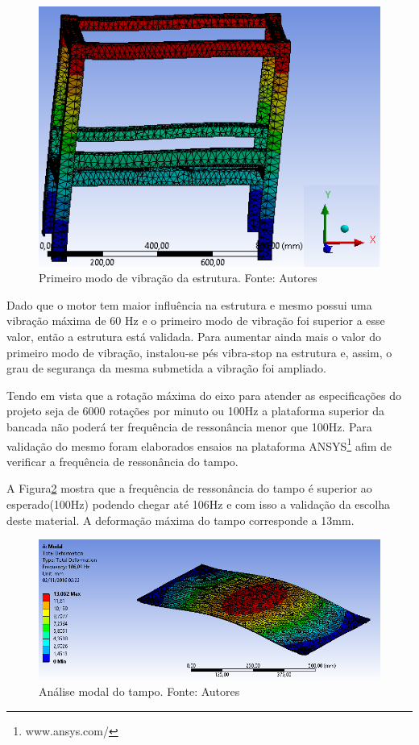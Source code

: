   \begin{figure}[H]
      \centering
      \includegraphics[scale=0.6]{figuras/vib_estrutura.png}
      \caption{Primeiro modo de vibração da estrutura. Fonte: Autores}
      \label{fig:vib_estrutura}
      \end{figure}

      Dado que o motor tem maior influência na estrutura e mesmo possui uma vibração máxima de 60 Hz e o primeiro modo de vibração foi superior a esse valor, então a estrutura está validada. Para aumentar ainda mais o valor do primeiro modo de vibração, instalou-se pés vibra-stop na estrutura e, assim, o grau de segurança da mesma submetida a vibração foi ampliado.


    Tendo em vista que a rotação máxima do eixo para atender as especificações do projeto seja de 6000 rotações por minuto ou 100Hz a plataforma superior da bancada não poderá ter frequência de ressonância menor que 100Hz. Para validação do mesmo foram elaborados ensaios na plataforma ANSYS\footnote{www.ansys.com/} afim de verificar a frequência de ressonância do tampo.

    A Figura\ref{fig:tampo} mostra que a frequência de ressonância do tampo é superior ao esperado(100Hz) podendo chegar até 106Hz e com isso a validação da escolha deste material. A deformação máxima do tampo corresponde a 13mm.

  \begin{figure}[H]
      \centering
      \includegraphics[scale=0.6]{figuras/tampo.png}
      \caption{Análise modal do tampo. Fonte: Autores}
      \label{fig:tampo}
      \end{figure}

